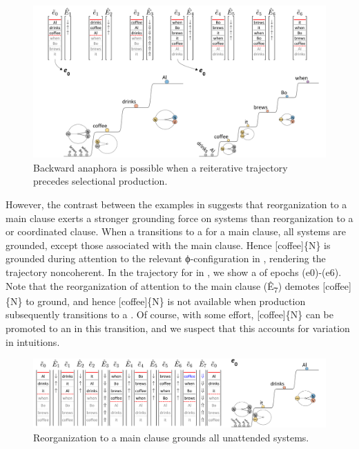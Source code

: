 \ea\label{ex:7:1}
\z
\z
  
\begin{figure}
\includegraphics[width=\textwidth]{figures/Tilsen-img154.png}
\caption{Backward anaphora is possible when a reiterative trajectory precedes selectional production.}
\label{fig:7:10}
\end{figure}
 

  However, the  contrast between the examples in  suggests that reorganization to a main clause exerts a stronger grounding force on systems than reorganization to a  or coordinated clause. When a  transitions to a  for a main clause, all systems are grounded, except those associated with the main clause. Hence [coffee]\{N\} is grounded during attention to the relevant ϕ-con\-fig\-u\-ra\-tion in , rendering the trajectory noncoherent. In the trajectory for  in {}, we show a  of epochs (e0)-(e6). Note that the reorganization of attention to the main clause (Ê\textsubscript{7}) demotes [coffee]\{N\} to ground, and hence [coffee]\{N\} is not available when production subsequently transitions to a . Of course, with some effort, [coffee]\{N\} can be promoted to an  in this transition, and we suspect that this accounts for variation in  intuitions. 

\ea\label{ex:7:2}
\z
\z
  
\begin{figure}
\includegraphics[width=\textwidth]{figures/Tilsen-img155.png}
\caption{Reorganization to a main clause grounds all unattended systems.}
\label{fig:7:11}
\end{figure}
 

